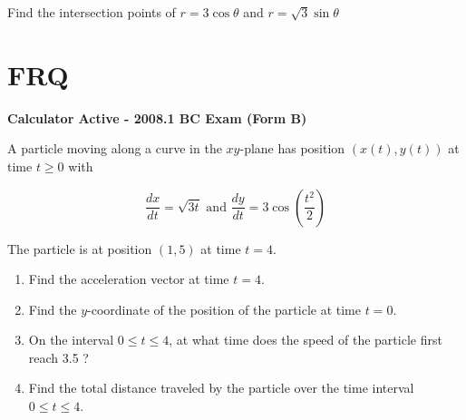 \documentclass[11pt]{exam}
\begin{document}
\begin{questions}
\begin{minipage}{\linewidth}


\question Find the intersection points of $r = 3 \cos \theta$ and $r = \sqrt3 \sin \theta$

\begin{choices}

\end{choices} \answerline
\end{minipage}

\end{questions}

\clearpage
\section{FRQ}
\noindent
\textbf{Calculator Active - 2008.1 BC Exam (Form B)}
\vspace{2ex}

A particle moving along a curve in the $x y$-plane has position $(x(t), y(t))$ at time $t \geq 0$ with

$$
\frac{d x}{d t}=\sqrt{3 t} \text { and } \frac{d y}{d t}=3 \cos \left(\frac{t^{2}}{2}\right)
$$

The particle is at position $(1,5)$ at time $t=4$.
\begin{enumerate}
\item Find the acceleration vector at time $t=4$.
\item Find the $y$-coordinate of the position of the particle at time $t=0$.
\item On the interval $0 \leq t \leq 4$, at what time does the speed of the particle first reach 3.5 ?
\item Find the total distance traveled by the particle over the time interval $0 \leq t \leq 4$.
\end{enumerate}
\end{document}
